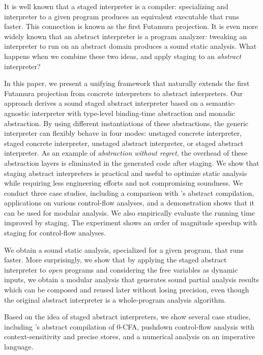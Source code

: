 It is well known that a staged interpreter is a compiler: specializing and
interpreter to a given program produces an equivalent executable that runs faster.
This connection is known as the first Futamura projection.
It is even more widely known that an abstract interpreter is a program analyzer:
tweaking an interpreter to run on an abstract domain produces a sound static
analysis. What happens when we combine these two ideas, and apply staging to
an \emph{abstract} interpreter?

In this paper, we present a unifying framework that naturally extends the first
Futamura projection from concrete interpreters to abstract interpreters. Our
approach derives a sound staged abstract interpreter based on a
semantic-agnostic interpreter with type-level binding-time abstraction and
monadic abstraction. By using different instantiations of these abstractions,
the generic interpreter can flexibly behave in four modes: unstaged concrete
interpreter, staged concrete interpreter, unstaged abstract interpreter, or
staged abstract interpreter.
As an example of \emph{abstraction without regret}, the overhead of these
abstraction layers is eliminated in the generated code after staging.
We show that staging abstract interpreters is practical and useful to
optimize static analysis while requiring less engineering efforts and not
compromising soundness. We conduct three case studies, including a comparison
with \citeauthor{Boucher:1996:ACN:647473.727587}'s abstract compilation,
applications on various control-flow analyses, and a demonstration shows that
it can be used for modular analysis.
We also empirically evaluate the running time improved by staging.
The experiment shows an order of magnitude speedup with staging for
control-flow analyses.

\iffalse
We obtain a sound static analysis, specialized for
a given program, that runs faster. More surprisingly, we show that by applying
the staged abstract interpreter to \textit{open} programs and considering the
free variables as dynamic inputs, we obtain a modular analysis that generates
sound partial analysis results which can be composed and reused later without
losing precision, even though the original abstract interpreter is a
whole-program analysis algorithm.

Based on the idea of staged abstract interpreters, we show several case studies,
including \citeauthor{Boucher:1996:ACN:647473.727587}'s abstract compilation of
0-CFA, pushdown control-flow analysis with context-sensitivity and precise
stores, and a numerical analysis on an imperative language.

